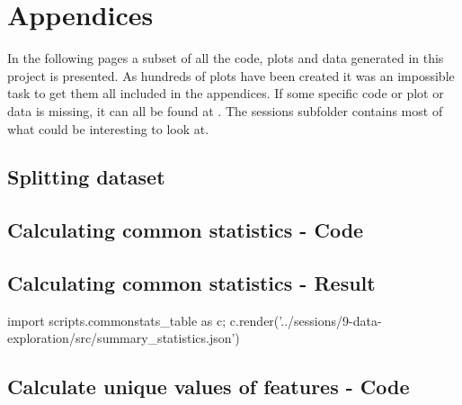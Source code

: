 \chapter{Appendices}
In the following pages a subset of all the code, plots and data generated in this project is presented. As hundreds of plots have been created it was an impossible task to get them all included in the appendices. If some specific code or plot or data is missing, it can all be found at \githuburl{}. The sessions subfolder contains most of what could be interesting to look at.
\pagebreak

\section{Splitting dataset} %
\label{app:source-splitting-data}

\clearpage

\section{Calculating common statistics - Code}\label{app:source-common-statistics}



\pagebreak

\section{Calculating common statistics - Result}\label{app:result-common-statistics}
{\small\sffamily
\begin{python}
    import scripts.commonstats_table as c; c.render('../sessions/9-data-exploration/src/summary_statistics.json')
\end{python}
}

\clearpage

\section{Calculate unique values of features - Code} %
\label{app:source-unique-values}




